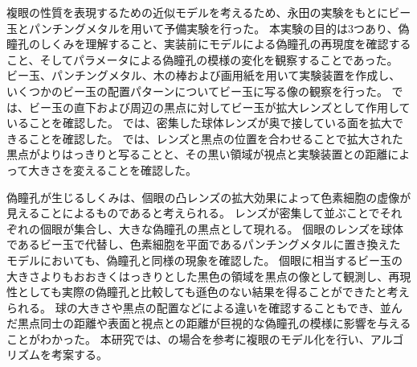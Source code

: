 複眼の性質を表現するための近似モデルを考えるため、永田の実験をもとにビー玉とパンチングメタルを用いて予備実験を行った。
本実験の目的は3つあり、偽瞳孔のしくみを理解すること、実装前にモデルによる偽瞳孔の再現度を確認すること、そしてパラメータによる偽瞳孔の模様の変化を観察することであった。
ビー玉、パンチングメタル、木の棒および画用紙を用いて実験装置を作成し、いくつかのビー玉の配置パターンについてビー玉に写る像の観察を行った。
では、ビー玉の直下および周辺の黒点に対してビー玉が拡大レンズとして作用していることを確認した。
では、密集した球体レンズが奥で接している面を拡大できることを確認した。
では、レンズと黒点の位置を合わせることで拡大された黒点がよりはっきりと写ることと、その黒い領域が視点と実験装置との距離によって大きさを変えることを確認した。

偽瞳孔が生じるしくみは、個眼の凸レンズの拡大効果によって色素細胞の虚像が見えることによるものであると考えられる。
レンズが密集して並ぶことでそれぞれの個眼が集合し、大きな偽瞳孔の黒点として現れる。
個眼のレンズを球体であるビー玉で代替し、色素細胞を平面であるパンチングメタルに置き換えたモデルにおいても、偽瞳孔と同様の現象を確認した。
個眼に相当するビー玉の大きさよりもおおきくはっきりとした黒色の領域を黒点の像として観測し、再現性としても実際の偽瞳孔と比較しても遜色のない結果を得ることができたと考えられる。
球の大きさや黒点の配置などによる違いを確認することもでき、並んだ黒点同士の距離や表面と視点との距離が巨視的な偽瞳孔の模様に影響を与えることがわかった。
本研究では、の場合を参考に複眼のモデル化を行い、アルゴリズムを考案する。
